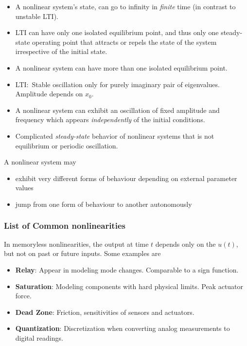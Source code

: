 \begin{itemize}
    \item A nonlinear system's state, can go to infinity in \textit{finite} time (in contrast to unstable LTI).
\end{itemize}

\newpar{}

\begin{itemize}
    \item LTI can have only one isolated equilibrium point, and thus only one steady-state operating point that attracts or repels the state of the system irrespective of the initial state.
    \item A nonlinear system can have more than one isolated equilibrium point.
\end{itemize}

\newpar{}

\begin{itemize}
    \item LTI:\ Stable oscillation only for purely imaginary pair of eigenvalues. Amplitude depends on $x_0$.
    \item A nonlinear system can exhibit an oscillation of fixed amplitude and frequency which appears \textit{independently} of the initial conditions.
\end{itemize}

\newpar{}

\begin{itemize}
    \item Complicated \textit{steady-state} behavior of nonlinear systems that is not equilibrium or periodic oscillation.
\end{itemize}

\newpar{}

A nonlinear system may
\begin{itemize}
    \item exhibit very different forms of behaviour depending on external parameter values
    \item jump from one form of behaviour to another autonomously
\end{itemize}


\subsubsection{List of Common nonlinearities}
In memoryless nonlinearities, the output at time $t$ depends only on the $u(t)$, but not on past or future inputs. Some examples are
\begin{itemize}
    \item \textbf{Relay}: Appear in modeling mode changes. Comparable to a sign function.
    \item \textbf{Saturation}: Modeling components with hard physical limits. Peak actuator force.
    \item \textbf{Dead Zone}: Friction, sensitivities of sensors and actuators.
    \item \textbf{Quantization}: Discretization when converting analog measurements to digital readings.
\end{itemize}


